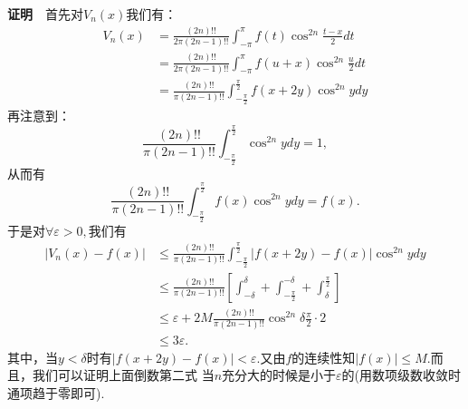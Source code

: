 \documentclass[UTF8]{article}
\newcommand{\zm}{\textbf{证明}$\quad$}
\begin{document}
  \zm 首先对$V_n(x)$我们有：
  \begin{align*}
    V_n(x)&=\frac{(2n)!!}{2\pi(2n-1)!!}\int_{-\pi}^\pi f(t)\cos^{2n}\frac{t-x}{2}dt\\
    &=\frac{(2n)!!}{2\pi(2n-1)!!}\int_{-\pi}^\pi f(u+x)\cos^{2n}\frac{u}{2}dt\\
    &=\frac{(2n)!!}{\pi(2n-1)!!}\int_{-\frac{\pi}{2}}^\frac{\pi}{2} f(x+2y)\cos^{2n}ydy
  \end{align*}
  再注意到：
  $$\frac{(2n)!!}{\pi(2n-1)!!}\int_{-\frac{\pi}{2}}^\frac{\pi}{2}\cos^{2n}ydy=1,$$
  从而有
  $$\frac{(2n)!!}{\pi(2n-1)!!}\int_{-\frac{\pi}{2}}^\frac{\pi}{2}f(x)\cos^{2n}ydy=f(x).$$
  于是对$\forall\varepsilon>0,$我们有
  \begin{align*}
    |V_n(x)-f(x)|&\le\frac{(2n)!!}{\pi(2n-1)!!}\int_{-\frac{\pi}{2}}^\frac{\pi}{2}|f(x+2y)-f(x)|\cos^{2n}ydy\\
    &\le\frac{(2n)!!}{\pi(2n-1)!!}[\int_{-\delta}^\delta+\int_{-\frac{\pi}{2}}^{-\delta}+\int_{\delta}^\frac{\pi}{2}]\\
    &\le \varepsilon+2M\frac{(2n)!!}{\pi(2n-1)!!}\cos^{2n}\delta\frac{\pi}{2}\cdot2\\
    &\le 3\varepsilon.
  \end{align*}
  其中，当$y<\delta$时有$|f(x+2y)-f(x)|<\varepsilon.$又由$f$的连续性知$|f(x)|\le M.$而且，我们可以证明上面倒数第二式
  当$n$充分大的时候是小于$\varepsilon$的(用数项级数收敛时通项趋于零即可).
  \clearpage
\end{document}
